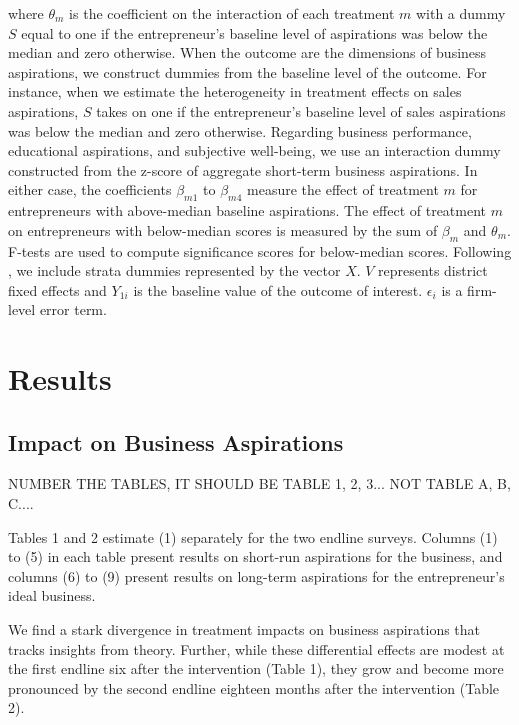 \documentclass[11.5pt]{article}
\begin{document}
where $\theta_m$ is the coefficient on the interaction of each treatment $m$ with a dummy $S$ equal to one if the entrepreneur's baseline level of aspirations was below the median and zero otherwise. When the outcome are the dimensions of business aspirations, we construct dummies from the baseline level of the outcome. For instance, when we estimate the heterogeneity in treatment effects on sales aspirations, $S$ takes on one if the entrepreneur's baseline level of sales aspirations was below the median and zero otherwise. Regarding business performance, educational aspirations, and subjective well-being, we use an interaction dummy constructed from the z-score of aggregate short-term business aspirations. In either case, the coefficients $\beta_{m1}$ to $\beta_{m4}$ measure the effect of treatment $m$ for entrepreneurs with above-median baseline aspirations. The effect of treatment $m$ on entrepreneurs with below-median scores is measured by the sum of $\beta_m$ and $\theta_m$. %
F-tests are used to compute significance scores for below-median scores. Following \citet{Bruhn2009}, we include strata dummies represented by the vector $X$. $V$ represents district fixed effects and $Y_{1i}$ is the baseline value of the outcome of interest. $\epsilon_i$ is a firm-level error term. 


\section{Results}\label{sec.analysis}

\subsection{Impact on Business Aspirations}

NUMBER THE TABLES, IT SHOULD BE TABLE 1, 2, 3... NOT TABLE A, B, C.... 

Tables 1 and 2 estimate (1) separately for the two endline surveys. Columns (1) to (5) in each table present results on short-run aspirations for the business, and columns (6) to (9) present results on long-term aspirations for the entrepreneur's ideal business. 

We find a stark divergence in treatment impacts on business aspirations that tracks insights from theory. Further, while these differential effects are modest at the first endline six after the intervention (Table 1), they grow and become more pronounced by the second endline eighteen months after the intervention (Table 2).  
\end{document}
